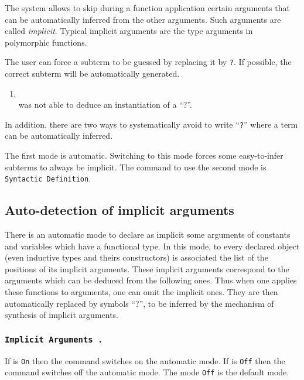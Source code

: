 \begin{coq_example}
The {\Coq} system allows to skip during a function application certain
arguments that can be automatically inferred from the other
arguments. Such arguments are called {\em implicit}. Typical implicit
arguments are the type arguments in polymorphic functions.

The user can force a subterm to be guessed by replacing it by
{\tt ?}. If possible, the correct subterm will be automatically generated.

\ErrMsg
\begin{enumerate}
\item {} \\
  {\Coq} was not able to deduce an instantiation of a ``?''.
\end{enumerate}

In addition, there are two ways to systematically avoid to write
``{\tt ?}'' where a term can be automatically inferred.

The first mode is automatic. Switching to this mode forces some
easy-to-infer subterms to always be implicit.
The command to use the second mode is  {\tt Syntactic
Definition}.

\subsection{Auto-detection of implicit arguments}
\label{Auto-implicit}

There is an automatic mode to declare as implicit some arguments of
constants and variables which have a functional type. In this mode,
to every declared object (even inductive types and theirs constructors) is
associated the list of the positions of its implicit arguments. These
implicit arguments correspond to the arguments which can be deduced
from the following ones. Thus when one applies these functions to
arguments, one can omit the implicit ones. They are then automatically
replaced by symbols ``?'', to be inferred by the mechanism of
synthesis of implicit arguments.

\subsubsection{\tt Implicit Arguments {\switch}.}
\label{Implicit Arguments}

If {\switch} is {\tt On} then the command switches on the automatic
mode. If {\switch} is {\tt Off} then the command switches off the
automatic mode. The mode {\tt Off} is the default mode.


\end{coq_example}
